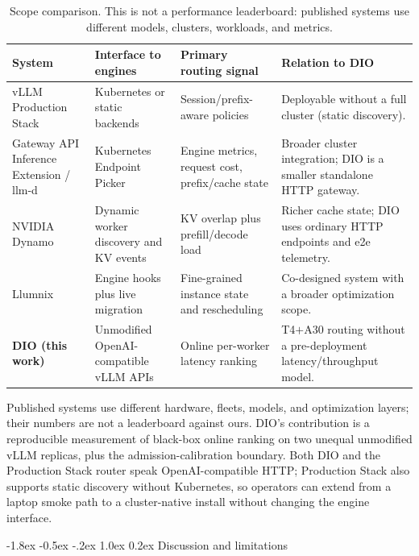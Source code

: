 \documentclass[pdflatex,sn-mathphys-num]{sn-jnl}
\makeatletter
\renewcommand{\section}{\@startsection{section}{1}{\z@}%
  {-1.8ex \@plus -0.5ex \@minus -.2ex}%
  {1.0ex \@plus 0.2ex}%
  {\normalfont\large\bfseries}}%
\makeatother
\begin{document}
\fi
\begin{table}[ht]
\caption{Scope comparison. This is not a performance leaderboard: published
systems use different models, clusters, workloads, and metrics.}
\label{tab:scope-compare}
\centering
\footnotesize
\setlength{\tabcolsep}{3pt}
\begin{tabular}{@{}p{2.2cm}p{2.4cm}p{2.1cm}p{3.4cm}@{}}
\toprule
System & Interface to engines & Primary routing signal & Relation to DIO \\
\midrule
vLLM Production Stack~\cite{productionstack}
 & Kubernetes or static backends & Session/prefix-aware policies
 & Deployable without a full cluster (static discovery). \\
Gateway API Inference Extension / llm-d~\cite{gaie,llmd}
 & Kubernetes Endpoint Picker & Engine metrics, request cost, prefix/cache state
 & Broader cluster integration; DIO is a smaller standalone HTTP gateway. \\
NVIDIA Dynamo~\cite{dynamo}
 & Dynamic worker discovery and KV events & KV overlap plus prefill/decode load
 & Richer cache state; DIO uses ordinary HTTP endpoints and e2e telemetry. \\
Llumnix~\cite{llumnix}
 & Engine hooks plus live migration & Fine-grained instance state and rescheduling
 & Co-designed system with a broader optimization scope. \\
\textbf{DIO (this work)}
 & Unmodified OpenAI-compatible vLLM APIs & Online per-worker latency ranking
 & T4$+$A30 routing without a pre-deployment latency/throughput model. \\
\bottomrule
\end{tabular}
\end{table}

Published systems use different hardware, fleets, models, and optimization layers;
their numbers are not a leaderboard against ours. DIO's contribution is a
reproducible measurement of black-box online ranking on two unequal unmodified vLLM
replicas, plus the admission-calibration boundary. Both DIO and the Production Stack
router speak OpenAI-compatible HTTP; Production Stack also supports static
discovery without Kubernetes, so operators can extend from a laptop smoke path to a
cluster-native install without changing the engine interface.

\section{Discussion and limitations}
\label{sec:limitations}
\end{document}
